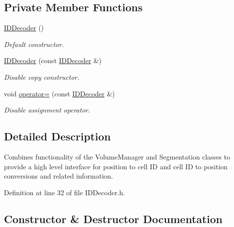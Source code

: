 \subsection*{Private Member Functions}
\begin{DoxyCompactItemize}
\item 
\hyperlink{class_d_d4hep_1_1_d_d_rec_1_1_i_d_decoder_af0d078d2fd6039aadb63d113b7a83367}{I\+D\+Decoder} ()
\begin{DoxyCompactList}\small\item\em Default constructor. \end{DoxyCompactList}\item 
\hyperlink{class_d_d4hep_1_1_d_d_rec_1_1_i_d_decoder_a428873f9f3597175d44b1e150ebf84e8}{I\+D\+Decoder} (const \hyperlink{class_d_d4hep_1_1_d_d_rec_1_1_i_d_decoder}{I\+D\+Decoder} \&)
\begin{DoxyCompactList}\small\item\em Disable copy constructor. \end{DoxyCompactList}\item 
void \hyperlink{class_d_d4hep_1_1_d_d_rec_1_1_i_d_decoder_ac635e457d5748ceb74f795a6f8ad8a46}{operator=} (const \hyperlink{class_d_d4hep_1_1_d_d_rec_1_1_i_d_decoder}{I\+D\+Decoder} \&)
\begin{DoxyCompactList}\small\item\em Disable assignment operator. \end{DoxyCompactList}\end{DoxyCompactItemize}


\subsection{Detailed Description}
Combines functionality of the Volume\+Manager and Segmentation classes to provide a high level interface for position to cell ID and cell ID to position conversions and related information. 

Definition at line 32 of file I\+D\+Decoder.\+h.



\subsection{Constructor \& Destructor Documentation}
\hypertarget{class_d_d4hep_1_1_d_d_rec_1_1_i_d_decoder_ae33c4d2a1adca58755ef45b8d7c47571}{}\label{class_d_d4hep_1_1_d_d_rec_1_1_i_d_decoder_ae33c4d2a1adca58755ef45b8d7c47571} 
